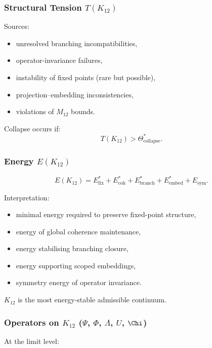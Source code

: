 \subsubsection{Structural Tension $T(K_{12})$}

Sources:
\begin{itemize}
    \item unresolved branching incompatibilities,
    \item operator-invariance failures,
    \item instability of fixed points (rare but possible),
    \item projection–embedding inconsistencies,
    \item violations of $M_{12}$ bounds.
\end{itemize}

Collapse occurs if:
\[
T(K_{12}) > \Theta^*_{\mathrm{collapse}}.
\]

\subsubsection{Energy $E(K_{12})$}

\[
E(K_{12}) =
E_{\mathrm{fix}}^*
+E_{\mathrm{coh}}^*
+E_{\mathrm{branch}}^*
+E_{\mathrm{embed}}^*
+E_{\mathrm{sym}}.
\]

Interpretation:
\begin{itemize}
    \item minimal energy required to preserve fixed-point structure,
    \item energy of global coherence maintenance,
    \item energy stabilising branching closure,
    \item energy supporting scoped embeddings,
    \item symmetry energy of operator invariance.
\end{itemize}

$K_{12}$ is the most energy-stable admissible continuum.

\subsubsection{Operators on $K_{12}$ ($\Psi$, $\Phi$, $\Lambda$, $U$, $\Chi$)}

At the limit level:


